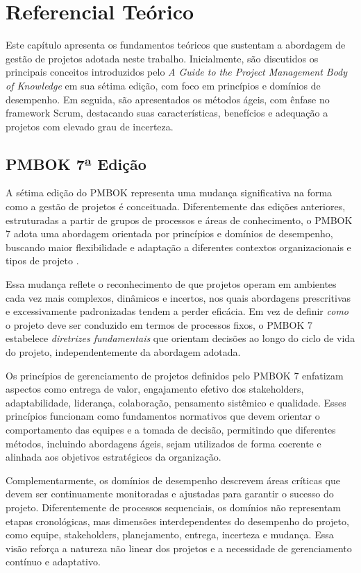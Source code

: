 \chapter{Referencial Teórico}\label{chp:ReferencialTeorico}

Este capítulo apresenta os fundamentos teóricos que sustentam a abordagem de gestão de projetos adotada neste trabalho. Inicialmente, são discutidos os principais conceitos introduzidos pelo \textit{A Guide to the Project Management Body of Knowledge} em sua sétima edição, com foco em princípios e domínios de desempenho. Em seguida, são apresentados os métodos ágeis, com ênfase no framework Scrum, destacando suas características, benefícios e adequação a projetos com elevado grau de incerteza.

\section{PMBOK 7ª Edição}

A sétima edição do PMBOK representa uma mudança significativa na forma como a gestão de projetos é conceituada. Diferentemente das edições anteriores, estruturadas a partir de grupos de processos e áreas de conhecimento, o PMBOK 7 adota uma abordagem orientada por princípios e domínios de desempenho, buscando maior flexibilidade e adaptação a diferentes contextos organizacionais e tipos de projeto \cite{PMBOK7}.

Essa mudança reflete o reconhecimento de que projetos operam em ambientes cada vez mais complexos, dinâmicos e incertos, nos quais abordagens prescritivas e excessivamente padronizadas tendem a perder eficácia. Em vez de definir \textit{como} o projeto deve ser conduzido em termos de processos fixos, o PMBOK 7 estabelece \textit{diretrizes fundamentais} que orientam decisões ao longo do ciclo de vida do projeto, independentemente da abordagem adotada.

Os princípios de gerenciamento de projetos definidos pelo PMBOK 7 enfatizam aspectos como entrega de valor, engajamento efetivo dos stakeholders, adaptabilidade, liderança, colaboração, pensamento sistêmico e qualidade. Esses princípios funcionam como fundamentos normativos que devem orientar o comportamento das equipes e a tomada de decisão, permitindo que diferentes métodos, incluindo abordagens ágeis, sejam utilizados de forma coerente e alinhada aos objetivos estratégicos da organização.

Complementarmente, os domínios de desempenho descrevem áreas críticas que devem ser continuamente monitoradas e ajustadas para garantir o sucesso do projeto. Diferentemente de processos sequenciais, os domínios não representam etapas cronológicas, mas dimensões interdependentes do desempenho do projeto, como equipe, stakeholders, planejamento, entrega, incerteza e mudança. Essa visão reforça a natureza não linear dos projetos e a necessidade de gerenciamento contínuo e adaptativo.

